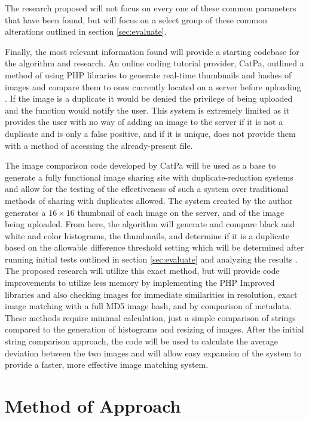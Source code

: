 \documentclass[11pt]{article}
\begin{document}
The research proposed will not focus on every one of these common parameters that have been found, but will focus on a select group of these common alterations outlined in section \ref{sec:evaluate}.

Finally, the most relevant information found will provide a starting codebase for the algorithm and research. An online coding tutorial provider, CatPa, outlined a method of using PHP libraries to generate real-time thumbnails and hashes of images and compare them to ones currently located on a server before uploading \cite{catpa:gdcode}. If the image is a duplicate it would be denied the privilege of being uploaded and the function would notify the user. This system is extremely limited as it provides the user with no way of adding an image to the server if it is not a duplicate and is only a false positive, and if it is unique, does not provide them with a method of accessing the already-present file.

The image comparison code developed by CatPa will be used as a base to generate a fully functional image sharing site with duplicate-reduction systems and allow for the testing of the effectiveness of such a system over traditional methods of sharing with duplicates allowed. The system created by the author\cite{catpa:gdcode} generates a $16\times 16$ thumbnail of each image on the server, and of the image being uploaded. From here, the algorithm will generate and compare black and white and color histograms, the thumbnails, and determine if it is a duplicate based on the allowable difference threshold setting which will be determined after running initial tests outlined in section \ref{sec:evaluate} and analyzing the results \cite{catpa:gdcode}. The proposed research will utilize this exact method, but will provide code improvements to utilize less memory by implementing the PHP Improved libraries and also checking images for immediate similarities in resolution, exact image matching with a full MD5 image hash, and by comparison of metadata. These methods require minimal calculation, just a simple comparison of strings compared to the generation of histograms and resizing of images. After the initial string comparison approach, the code will be used to calculate the average deviation between the two images and will allow easy expansion of the system to provide a faster, more effective image matching system.

\vspace*{-.2in}
\section{Method of Approach}
\label{sec:method}
\vspace*{-.1in}
\end{document}
